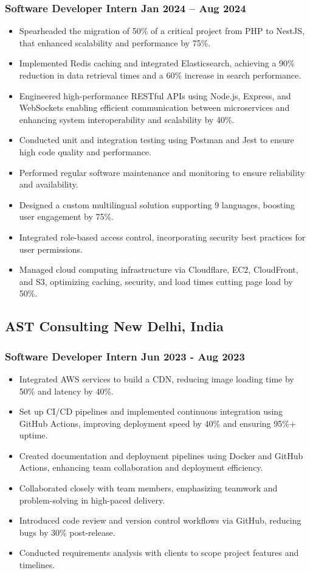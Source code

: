 \documentclass[10pt]{article}
\newcommand{\rside}[1]{
  \hfill {\small\color{accent} #1}%
}
\begin{document}
\subsubsection{Software Developer Intern \rside{Jan 2024 -- Aug 2024}}
\begin{itemize}
    \item Spearheaded the migration of 50\% of a critical project from PHP to NestJS, that enhanced scalability and performance by 75\%.
    \item Implemented Redis caching and integrated Elasticsearch, achieving a 90\% reduction in data retrieval times and a 60\% increase in search performance.
    \item Engineered high-performance RESTful APIs using Node.js, Express, and WebSockets enabling efficient communication between microservices and enhancing system interoperability and scalability by 40\%.
    \item Conducted unit and integration testing using Postman and Jest to ensure high code quality and performance.
    \item Performed regular software maintenance and monitoring to ensure reliability and availability.
    \item Designed a custom multilingual solution supporting 9 languages, boosting user engagement by 75\%.
    \item Integrated role-based access control, incorporating security best practices for user permissions.
    \item Managed cloud computing infrastructure via Cloudflare, EC2, CloudFront, and S3, optimizing caching, security, and load times cutting page load by 50\%.
\end{itemize}

\subsection{AST Consulting \rside{New Delhi, India}}
\subsubsection{Software Developer Intern \rside{Jun 2023 - Aug 2023}}
\begin{itemize}
  \item Integrated AWS services to build a CDN, reducing image loading time by 50\% and latency by 40\%.
  \item Set up CI/CD pipelines and implemented continuous integration using GitHub Actions, improving deployment speed by 40\% and ensuring 95\%+ uptime.
  \item Created documentation and deployment pipelines using Docker and GitHub Actions, enhancing team collaboration and deployment efficiency.
  \item Collaborated closely with team members, emphasizing teamwork and problem-solving in high-paced delivery.
  \item Introduced code review and version control workflows via GitHub, reducing bugs by 30\% post-release.
  \item Conducted requirements analysis with clients to scope project features and timelines.
\end{itemize}
\end{document}
